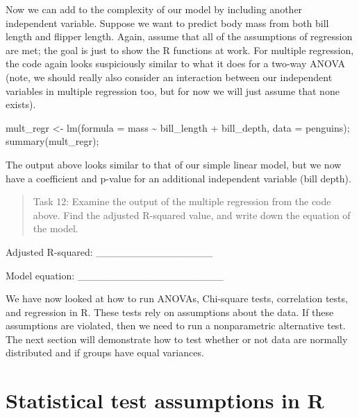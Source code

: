 \documentclass[
]{scrbook}
\newenvironment{Shaded}{\begin{snugshade}}{\end{snugshade}}
\newcommand{\AttributeTok}[1]{\textcolor[rgb]{0.77,0.63,0.00}{#1}}
\newcommand{\FunctionTok}[1]{\textcolor[rgb]{0.00,0.00,0.00}{#1}}
\newcommand{\NormalTok}[1]{#1}
\newcommand{\OtherTok}[1]{\textcolor[rgb]{0.56,0.35,0.01}{#1}}
\newcommand{\SpecialCharTok}[1]{\textcolor[rgb]{0.00,0.00,0.00}{#1}}
\begin{document}
Now we can add to the complexity of our model by including another independent variable.
Suppose we want to predict body mass from both bill length and flipper length.
Again, assume that all of the assumptions of regression are met; the goal is just to show the R functions at work.
For multiple regression, the code again looks suspiciously similar to what it does for a two-way ANOVA (note, we should really also consider an interaction between our independent variables in multiple regression too, but for now we will just assume that none exists).

\begin{Shaded}
\begin{Highlighting}[]
\NormalTok{mult\_regr }\OtherTok{\textless{}{-}} \FunctionTok{lm}\NormalTok{(}\AttributeTok{formula =}\NormalTok{ mass }\SpecialCharTok{\textasciitilde{}}\NormalTok{ bill\_length }\SpecialCharTok{+}\NormalTok{ bill\_depth, }
                \AttributeTok{data =}\NormalTok{ penguins);}
\FunctionTok{summary}\NormalTok{(mult\_regr);}
\end{Highlighting}
\end{Shaded}

The output above looks similar to that of our simple linear model, but we now have a coefficient and p-value for an additional independent variable (bill depth).

\begin{quote}
Task 12: Examine the output of the multiple regression from the code above. Find the adjusted R-squared value, and write down the equation of the model.
\end{quote}

Adjusted R-squared: \_\_\_\_\_\_\_\_\_\_\_\_\_\_\_\_

Model equation: \_\_\_\_\_\_\_\_\_\_\_\_\_\_\_\_\_\_\_\_

We have now looked at how to run ANOVAs, Chi-square tests, correlation tests, and regression in R.
These tests rely on assumptions about the data.
If these assumptions are violated, then we need to run a nonparametric alternative test.
The next section will demonstrate how to test whether or not data are normally distributed and if groups have equal variances.

\hypertarget{statistical-test-assumptions-in-r}{%
\section{Statistical test assumptions in R}\label{statistical-test-assumptions-in-r}}
\end{document}
